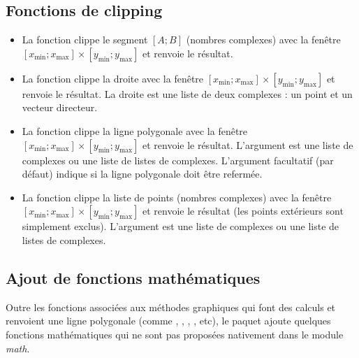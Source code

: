 \subsection{Fonctions de clipping}

\begin{itemize}
    \item La fonction  clippe le segment $[A;B]$ (nombres complexes) avec la fenêtre $[x_{\mathrm{min}};x_{\mathrm{max}}]\times [y_{\mathrm{min}};y_{\mathrm{max}}]$ et renvoie le résultat.
    
    \item La fonction  clippe la droite  avec la fenêtre $[x_{\mathrm{min}};x_{\mathrm{max}}]\times [y_{\mathrm{min}};y_{\mathrm{max}}]$ et renvoie le résultat. La droite  est une liste de deux complexes : un point et un vecteur directeur.
    
    \item La fonction  clippe la ligne polygonale  avec la fenêtre $[x_{\mathrm{min}};x_{\mathrm{max}}]\times [y_{\mathrm{min}};y_{\mathrm{max}}]$ et renvoie le résultat. L'argument  est une liste de complexes ou une liste de listes de complexes. L'argument facultatif  (\false par défaut) indique si la ligne polygonale doit être refermée.
    
    \item La fonction  clippe la liste de points (nombres complexes)  avec la fenêtre $[x_{\mathrm{min}};x_{\mathrm{max}}]\times [y_{\mathrm{min}};y_{\mathrm{max}}]$ et renvoie le résultat (les points extérieurs sont simplement exclus). L'argument  est une liste de complexes ou une liste de listes de complexes.
\end{itemize}

\subsection{Ajout de fonctions mathématiques}

Outre les fonctions associées aux méthodes graphiques qui font des calculs et renvoient une ligne polygonale (comme , , , , etc), le paquet \luadrawenv ajoute quelques fonctions mathématiques qui ne sont pas proposées nativement dans le module \emph{math}.

